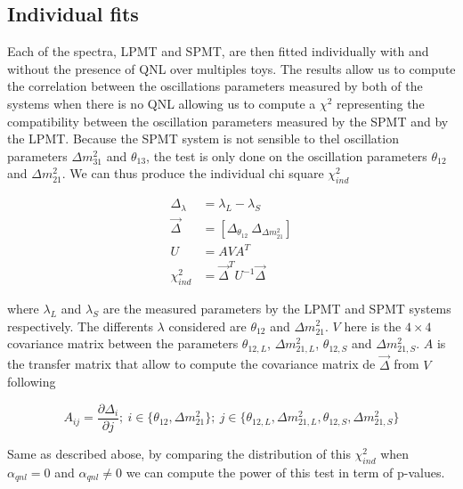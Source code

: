 \documentclass[../main.tex]{subfiles}
\begin{document}

\subsection{Individual fits}

Each of the spectra, LPMT and SPMT, are then fitted individually with and without the presence of QNL over multiples toys. The results allow us to compute the correlation between the oscillations parameters measured by both of the systems when there is no QNL allowing us to compute a $\chi^2$ representing the compatibility between the oscillation parameters measured by the SPMT and by the LPMT. Because the SPMT system is not sensible to thel oscillation parameters $\Delta m^2_{31}$ and $\theta_{13}$, the test is only done on the oscillation parameters $\theta_{12}$ and $\Delta m^2_{21}$. We can thus produce the individual chi square $\chi^2_{ind}$

\begin{align}
  \Delta_\lambda &= \lambda_{L} - \lambda_{S} \\
  \vec{\Delta} &= [ \Delta_{\theta_{12}} ~ \Delta_{\Delta m^2_{21}} ] \\
  U &= A V A^T \\
  \chi^2_{ind} &= \vec{\Delta}^T U^{-1} \vec{\Delta}
\end{align}

where $\lambda_{L}$ and $\lambda_{S}$ are the measured parameters by the LPMT and SPMT systems respectively. The differents $\lambda$ considered are $\theta_{12}$ and $\Delta m^2_{21}$. $V$ here is the $4\times 4$ covariance matrix between the parameters $\theta_{12, L}$, $\Delta m^2_{21, L}$, $\theta_{12, S}$ and  $\Delta m^2_{21, S}$. $A$ is the transfer matrix that allow to compute the covariance matrix de $\vec{\Delta}$ from $V$ following

\begin{equation}
  A_{ij} = \frac{\partial \Delta_i}{\partial j}; ~ i \in \{ \theta_{12}, \Delta m^2_{21} \}; ~ j \in \{ \theta_{12, L}, \Delta m^2_{21, L}, \theta_{12, S}, \Delta m^2_{21, S} \}
\end{equation}

Same as described abose, by comparing the distribution of this $\chi^2_{ind}$ when $\alpha_{qnl} = 0$ and $\alpha_{qnl} \neq 0$ we can compute the power of this test in term of p-values.
\end{document}
